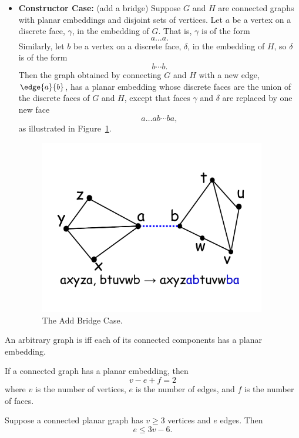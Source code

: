 \documentclass[handout]{mcs}
\begin{document}
\begin{definition}
\begin{itemize}
\item \textbf{Constructor Case:} (add a bridge) Suppose $G$ and $H$ are
connected graphs with planar embeddings and disjoint sets of vertices.
Let $a$ be a vertex on a discrete face, $\gamma$, in the embedding of
$G$.  That is, $\gamma$ is of the form
\[
a\dots a.
\]
Similarly, let $b$ be a vertex on a discrete face, $\delta$, in the
embedding of $H$, so $\delta$ is of the form
\[
b\cdots b.
\]
Then the graph obtained by connecting $G$ and $H$ with a new edge,
$\edge{a}{b}$, has a planar embedding whose discrete faces are the union of
the discrete faces of $G$ and $H$, except that faces $\gamma$ and $\delta$
are replaced by one new face
\[
a\dots ab\cdots ba,
\]
as illustrated in Figure~\ref{cp7f.fig:add-bridge}.

\begin{figure}[h]
\centering \includegraphics[height=3in]{figures/add-bridge}
\caption{The Add Bridge Case.}
\label{cp7f.fig:add-bridge}
\end{figure}

\end{itemize}

An arbitrary graph is  iff each of its connected
components has a planar embedding.

\end{definition}

\begin{theorem}
If a connected graph has a planar embedding, then
%
\[
v - e + f = 2
\]
%
where $v$ is the number of vertices, $e$ is the number of edges, and
$f$ is the number of faces.
\end{theorem}

\begin{corollary}
\label{cp7f.3v}
Suppose a connected planar graph has $v \geq 3$ vertices and $e$ edges.  Then
\[
e \leq 3v-6.
\]
\end{corollary}
\end{document}
